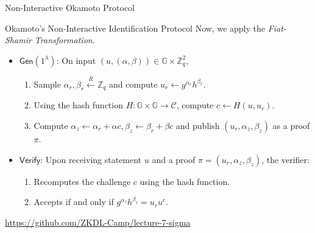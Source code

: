 \documentclass{zkdl-presentation-template}
\begin{document}
    \begin{frame}{Non-Interactive Okamoto Protocol}
        \begin{block}{Okamoto's Non-Interactive Identification Protocol}
            Now, we apply the \textit{Fiat-Shamir Transformation}.
            \begin{itemize}
                \item $\mathsf{Gen}(1^{\lambda})$: On input $(u,(\alpha,\beta)) \in \mathbb{G} \times \mathbb{Z}_q^2$, 
                \begin{enumerate}
                    \item Sample $\alpha_r,\beta_r \xleftarrow{R} \mathbb{Z}_q$ and compute $u_r \gets g^{\alpha_r}h^{\beta_r}$.
                    \item Using the hash function $H: \mathbb{G} \times \mathbb{G} \to \mathcal{C}$, compute $c \gets H(u,u_r)$.
                    \item Compute $\alpha_z \gets \alpha_r + \alpha c, \beta_z \gets \beta_r + \beta c$ and publish $(u_r,\alpha_z,\beta_z)$ as a proof $\pi$.
                \end{enumerate}
                \item $\mathsf{Verify}$: Upon receiving statement $u$ and a proof $\pi=(u_r,\alpha_z,\beta_z)$, the verifier:
                \begin{enumerate}
                    \item Recomputes the challenge $c$ using the hash function.
                    \item Accepts if and only if $g^{\alpha_z}h^{\beta_z} = u_ru^c$.
                \end{enumerate}
            \end{itemize}
        \end{block}

        \begin{center}
            \textcolor{oc-pink-7}{\url{https://github.com/ZKDL-Camp/lecture-7-sigma}}
        \end{center}
    \end{frame}
\end{document}
